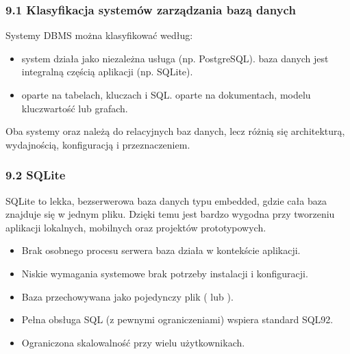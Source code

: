 \documentclass[a4paper,11pt,openany,english]{sphinxmanual}
\begin{document}
\subsubsection{9.1 Klasyfikacja systemów zarządzania bazą danych}
\label{\detokenize{rozdzial2/Konfiguracja_baz_danych/Konfiguracja_baz_danych:klasyfikacja-systemow-zarzadzania-baza-danych}}
\sphinxAtStartPar
Systemy DBMS można klasyfikować według:
\begin{itemize}
\item {} 
\sphinxAtStartPar
{}
\sphinxhyphen{}  \textendash{} system działa jako niezależna usługa (np. PostgreSQL).
\sphinxhyphen{}  \textendash{} baza danych jest integralną częścią aplikacji (np. SQLite).

\item {} 
\sphinxAtStartPar
{}
\sphinxhyphen{}  \textendash{} oparte na tabelach, kluczach i SQL.
\sphinxhyphen{}  \textendash{} oparte na dokumentach, modelu klucz\sphinxhyphen{}wartość lub grafach.

\end{itemize}

\sphinxAtStartPar
Oba systemy \textendash{}  oraz  \textendash{} należą do relacyjnych baz danych, lecz różnią się architekturą, wydajnością, konfiguracją i przeznaczeniem.


\subsubsection{9.2 SQLite}
\label{\detokenize{rozdzial2/Konfiguracja_baz_danych/Konfiguracja_baz_danych:sqlite}}
\sphinxAtStartPar
SQLite to lekka, bezserwerowa baza danych typu embedded, gdzie cała baza znajduje się w jednym pliku. Dzięki temu jest bardzo wygodna przy tworzeniu aplikacji lokalnych, mobilnych oraz projektów prototypowych.

\sphinxAtStartPar
{}
\begin{itemize}
\item {} 
\sphinxAtStartPar
Brak osobnego procesu serwera \textendash{} baza działa w kontekście aplikacji.

\item {} 
\sphinxAtStartPar
Niskie wymagania systemowe \textendash{} brak potrzeby instalacji i konfiguracji.

\item {} 
\sphinxAtStartPar
Baza przechowywana jako pojedynczy plik ( lub ).

\item {} 
\sphinxAtStartPar
Pełna obsługa SQL (z pewnymi ograniczeniami) \textendash{} wspiera standard SQL\sphinxhyphen{}92.

\item {} 
\sphinxAtStartPar
Ograniczona skalowalność przy wielu użytkownikach.

\end{itemize}
\end{document}
